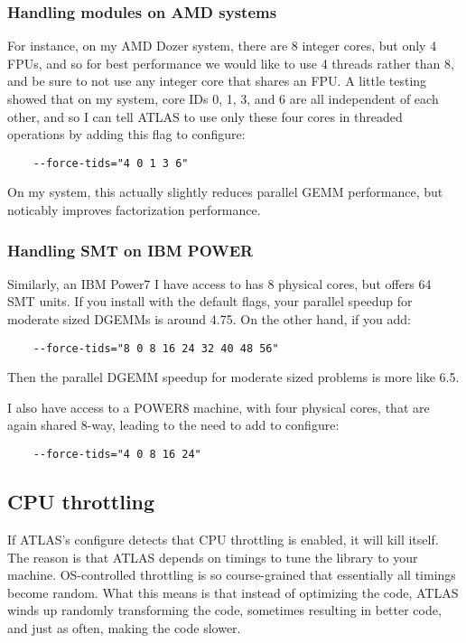 \documentclass[11pt]{article}
\begin{document}
\subsubsection{Handling modules on AMD systems}
For instance, on my AMD Dozer system,
there are 8 integer cores, but only 4 FPUs, and so for best performance we
would like to use 4 threads rather than 8, and be sure to not use any
integer core that shares an FPU.  A little testing showed that on my
system, core IDs 0, 1, 3, and 6 are all independent of each other, and so
I can tell ATLAS to use only these four cores in threaded operations by
adding this flag to configure:
\begin{verbatim}
    --force-tids="4 0 1 3 6"
\end{verbatim}
On my system, this actually slightly reduces parallel GEMM performance, but
noticably improves factorization performance.

\subsubsection{Handling SMT on IBM POWER}
Similarly, an IBM Power7 I have access to has 8 physical cores, but offers
64 SMT units.  If you install with the default flags, your parallel speedup
for moderate sized DGEMMs is around 4.75.  On the other hand, if you add:
\begin{verbatim}
    --force-tids="8 0 8 16 24 32 40 48 56"
\end{verbatim}
Then the parallel DGEMM speedup for moderate sized problems is more like 6.5.

I also have access to a POWER8 machine, with four physical cores, that are
again shared 8-way, leading to the need to add to configure:
\begin{verbatim}
    --force-tids="4 0 8 16 24"
\end{verbatim}

\clearpage
\subsection{CPU throttling}
\label{sec-throttle}
If ATLAS's configure detects that CPU throttling is enabled, it will kill
itself.  The reason is that ATLAS depends on timings to tune the library
to your machine.  OS-controlled throttling is so course-grained that 
essentially all timings become random.  What this means is that instead
of optimizing the code, ATLAS winds up randomly transforming the code,
sometimes resulting in better code, and just as often, making the code
slower.
\end{document}
